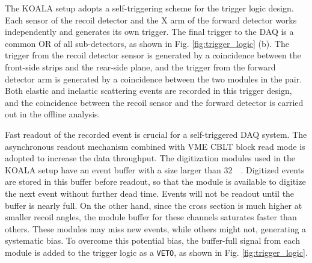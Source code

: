 \documentclass[number,5p]{elsarticle}
\begin{document}
The KOALA setup adopts a self-triggering scheme for the trigger logic design.
Each sensor of the recoil detector and the X arm of the forward detector works independently and generates its own trigger. 
The final trigger to the DAQ is a common OR of all sub-detectors, as shown in
Fig. \ref{fig:trigger_logic} (b).
The trigger from the recoil detector sensor is generated by a coincidence between the front-side strips and the rear-side plane, 
and the trigger from the forward detector arm is generated by a coincidence between the two modules in the pair.
Both elastic and inelastic scattering events are recorded in this trigger
design, and the coincidence between the recoil sensor and the forward detector
is carried out in the offline analysis.

Fast readout of the recorded event is crucial for a self-triggered DAQ system.
The asynchronous readout mechanism combined with VME CBLT block read mode is adopted to increase the data throughput.
The digitization modules used in the KOALA setup have an event buffer with a size
larger than \SI{32}{\kibi\byte}.
Digitized events are stored in this buffer before readout, so that the module is
available to digitize the next event without further dead time.
Events will not be readout until the buffer is nearly full.
On the other hand, since the cross section is much higher at smaller recoil
angles, the module buffer for these channels saturates faster than others.
These modules may miss new events, while others might not, generating a systematic bias.
To overcome this potential bias, the buffer-full signal from each module is added to the
trigger logic as a \texttt{VETO}, as shown in Fig. \ref{fig:trigger_logic}.
\end{document}
